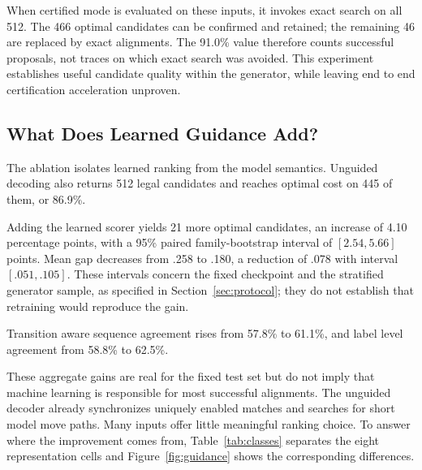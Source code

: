 When certified mode is evaluated on these inputs, it invokes exact search on all 512. The 466 optimal candidates can be confirmed and retained; the remaining 46 are replaced by exact alignments. The 91.0\% value therefore counts successful proposals, not traces on which exact search was avoided. This experiment establishes useful candidate quality within the generator, while leaving end to end certification acceleration unproven.

\subsection{What Does Learned Guidance Add?}
\label{sec:ablation}

The ablation isolates learned ranking from the model semantics. Unguided decoding also returns 512 legal candidates and reaches optimal cost on 445 of them, or 86.9\%. \begin{revised}Adding the learned scorer yields 21 more optimal candidates, an increase of 4.10 percentage points, with a 95\% paired family-bootstrap interval of $[2.54,5.66]$ points. Mean gap decreases from .258 to .180, a reduction of .078 with interval $[.051,.105]$. These intervals concern the fixed checkpoint and the stratified generator sample, as specified in Section~\ref{sec:protocol}; they do not establish that retraining would reproduce the gain.\end{revised} Transition aware sequence agreement rises from 57.8\% to 61.1\%, and label level agreement from 58.8\% to 62.5\%.

These aggregate gains are real for the fixed test set but do not imply that machine learning is responsible for most successful alignments. The unguided decoder already synchronizes uniquely enabled matches and searches for short model move paths. Many inputs offer little meaningful ranking choice. To answer where the improvement comes from, Table~\ref{tab:classes} separates the eight representation cells and Figure~\ref{fig:guidance} shows the corresponding differences.

